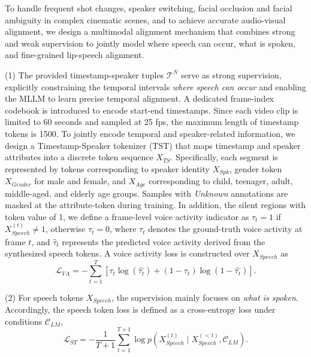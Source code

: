 \documentclass{article}
\begin{document}
To handle frequent shot changes, speaker switching, facial occlusion and facial ambiguity in complex cinematic scenes, 
and to achieve accurate audio-visual alignment, 
we design a multimodal alignment mechanism that combines strong and weak supervision
to jointly model where speech can occur, what is spoken, and fine-grained lip-speech alignment.

(1) The provided timestamp-speaker tuples $\mathcal{T}^N$ serve as strong supervision,
explicitly constraining the temporal intervals \emph{where speech can occur} and enabling the MLLM to learn precise temporal alignment.
A dedicated frame-index codebook is introduced to encode start-end timestamps.
Since each video clip is limited to 60 seconds and sampled at 25 fps, the maximum length of timestamp tokens is 1500.
To jointly encode temporal and speaker-related information, 
we design a Timestamp-Speaker tokenizer (TST) that maps timestamp and speaker attributes into a discrete token sequence $X_{TS}$.
Specifically, each segment is represented by tokens corresponding to speaker identity $X_{Spk}$, 
gender token $X_{Gender}$ for male and female, 
and $X_{Age}$ corresponding to child, teenager, adult, middle-aged, and elderly age groups.
Samples with \textit{Unknown} annotations are masked at the attribute-token during training.
In addition, the silent regions with token value of 1, 
we define a frame-level voice activity indicator as
$\tau_t=1$ if $X_{Speech}^{(t)} \neq 1$, otherwise $\tau_t=0$,
where $\tau_t$ denotes the ground-truth voice activity at frame $t$, 
and $\hat{\tau}_t$ represents the predicted voice activity derived from the synthesized speech tokens.
A voice activity loss is constructed over $X_{Speech}$ as
\begin{equation}
    \mathcal{L}_{VA}=-\sum_{t=1}^{T}[\tau_t \log(\hat{\tau_t}) + (1-\tau_t)\log(1-\hat{\tau_t})].
\end{equation}

(2) For speech tokens $X_{Speech}$, the supervision mainly focuses on \emph{what is spoken}.
Accordingly, the speech token loss is defined as a cross-entropy loss under conditions $\mathcal{C}_{LM}$,
\begin{equation}
    \mathcal{L}_{ST}=-\frac{1}{T+1}\sum_{t=1}^{T+1} \log p(X_{Speech}^{(t)} \mid X_{Speech}^{(<t)}, \mathcal{C}_{LM}).
\end{equation}
\end{document}
